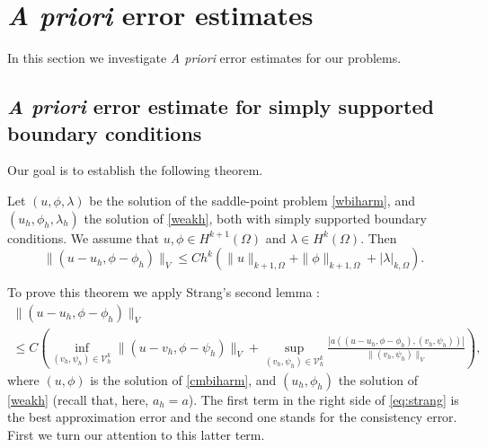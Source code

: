 \documentclass[a4paper,final]{siamltex}
\newcommand{\CV}{\mathcal{V}}
\begin{document}
\section{\emph{A priori} error estimates}\label{sec:error.est}
In this section we investigate \emph{A priori} error estimates for our problems.

\subsection{\emph{A priori} error estimate for simply supported boundary conditions}
Our goal is to establish the following theorem.
\begin{theorem}\label{th0}
Let $(u,\phi,\lambda)$ be the solution of the saddle-point problem 
\eqref{wbiharm}, and $(u_h,\phi_h,\lambda_h)$ the solution of \eqref{weakh},
both with simply supported boundary conditions.
We assume that $u,\phi\in H^{k+1}(\Omega)$ and 
$\lambda\in H^k(\Omega)$.
 Then 
\begin{equation} \label{eq:strang1}
\|(u-u_h,\phi-\phi_h)\|_{V} \leq 
C  h^{k} \left(\|u\|_{k+1,\Omega} + \|\phi\|_{k+1,\Omega}+ |\lambda|_{k,\Omega}\right).
\end{equation}
\end{theorem}

To prove this theorem we apply Strang's second lemma \cite{BS94}:
\begin{multline} \label{eq:strang}
\|(u-u_h,\phi-\phi_h)\|_{V} \\
\leq
C\left(\inf_{(v_h,\psi_h) \in \CV^k_h} \|(u-v_h,\phi-\psi_h)\|_{V}
+\sup_{(v_h,\psi_h) \in \CV^k_h} \frac{|a((u-u_h,\phi-\phi_h), (v_h,\psi_h))|}
{\|(v_h,\psi_h)\|_{V}}\right),
\end{multline}
where $(u,\phi)$ is the solution of \eqref{cmbiharm},
 and $(u_h,\phi_h)$ the solution of \eqref{weakh}
(recall that, here, $a_h=a$). 
The first term in the right side of \eqref{eq:strang} is the 
best approximation error and the second one stands for the consistency error. 
First we turn our attention to this latter term.
 
\end{document}
